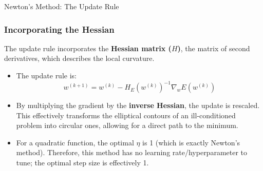\begin{frame}{Newton's Method: The Update Rule}
    \frametitle{Incorporating the Hessian}
    The update rule incorporates the \textbf{Hessian matrix ($H$)}, the matrix of second derivatives, which describes the local curvature.
    \begin{itemize}
        \item The update rule is:
            $$ w^{(k+1)} = w^{(k)} - H_{E}(w^{(k)})^{-1} \nabla_{w}E(w^{(k)}) $$
        \item By multiplying the gradient by the \textbf{inverse Hessian}, the update is rescaled. This effectively transforms the elliptical contours of an ill-conditioned problem into circular ones, allowing for a direct path to the minimum.
        \item For a quadratic function, the optimal $\eta$ is 1 (which is exactly Newton's method). Therefore, this method has no learning rate/hyperparameter to tune; the optimal step size is effectively 1.
    \end{itemize}
\end{frame}



